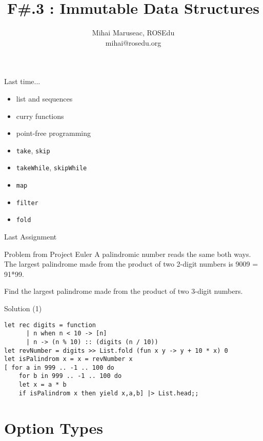 \documentclass{beamer}
\title{F\#.3 : Immutable Data Structures}
\author{Mihai Maruseac, ROSEdu\\mihai@rosedu.org}
\begin{document}
\maketitle

\begin{frame}
  \tableofcontents
\end{frame}

\begin{frame}{Last time...}
  \begin{itemize}[<+->]
    \item list and sequences
    \item curry functions
    \item point-free programming
    \item \texttt{take}, \texttt{skip}
    \item \texttt{takeWhile}, \texttt{skipWhile}
    \item \texttt{map}
    \item \texttt{filter}
    \item \texttt{fold}
  \end{itemize}
\end{frame}

\begin{frame}{Last Assignment}
  \begin{block}{Problem from Project Euler}
  A palindromic number reads the same both ways. The largest palindrome made
  from the product of two 2-digit numbers is 9009 = 91*99.

  Find the largest palindrome made from the product of two 3-digit numbers.
  \end{block}
\end{frame}

\begin{frame}[fragile]{Solution (1)}
\small
  \begin{verbatim}
let rec digits = function
      | n when n < 10 -> [n]
      | n -> (n % 10) :: (digits (n / 10))
let revNumber = digits >> List.fold (fun x y -> y + 10 * x) 0
let isPalindrom x = x = revNumber x
[ for a in 999 .. -1 .. 100 do
    for b in 999 .. -1 .. 100 do
    let x = a * b
    if isPalindrom x then yield x,a,b] |> List.head;;
\end{verbatim}
\end{frame}

\section{Option Types}
\frame{\tableofcontents[currentsection]}
\end{document}
